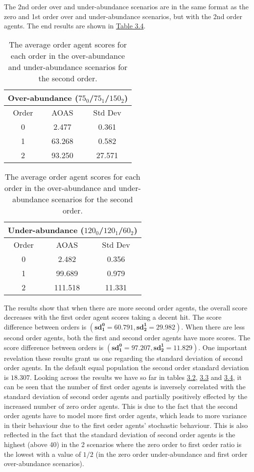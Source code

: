 The 2nd order over and under-abundance scenarios are in the same format as the zero and 1st order over and under-abundance scenarios, but with the 2nd order agents. The end results are shown in \hyperref[table:non-sig-second-order-simple]{Table 3.4}.

\begin{table}[h]
\centering
\begin{tabular}{|c|c|c|}
\hline
\multicolumn{3}{|c|}{Over-abundance ($75_{0}$/$75_{1}$/$150_{2}$)} \\
\hline
Order & AOAS & Std Dev \\
\hline
0     & 2.477   & 0.361    \\
1     & 63.268  & 0.582    \\
2     & 93.250  & 27.571   \\
\hline
\end{tabular}
\qquad
\begin{tabular}{|c|c|c|}
\hline
\multicolumn{3}{|c|}{Under-abundance ($120_{0}$/$120_{1}$/$60_{2}$)} \\
\hline
Order & AOAS & Std Dev \\
\hline
0     & 2.482   & 0.356   \\
1     & 99.689  & 0.979  \\
2     & 111.518 & 11.331 \\
\hline
\end{tabular}
\caption{The average order agent scores for each order in the over-abundance and under-abundance scenarios for the second order.}
\label{table:non-sig-second-order-simple}
\end{table}

The results show that when there are more second order agents, the overall score decreases with the first order agent scores taking a decent hit. The score difference between orders is $(\mathbf{sd^0_1 = 60.791}, \mathbf{sd^1_2 = 29.982})$. When there are less second order agents, both the first and second order agents have more scores. The score difference between orders is $(\mathbf{sd^0_1 = 97.207}, \mathbf{sd^1_2 = 11.829})$. One important revelation these results grant us one regarding the standard deviation of second order agents. In the default equal population the second order standard deviation is $\mathbf{18.307}$. Looking across the results we have so far in tables \hyperref[table:non-sig-zero-order-simple]{3.2}, \hyperref[table:non-sig-first-order-simple]{3.3} and \hyperref[table:non-sig-second-order-simple]{3.4}, it can be seen that the number of first order agents is inversely correlated with the standard deviation of second order agents and partially positively effected by the increased number of zero order agents. This is due to the fact that the second order agents have to model more first order agents, which leads to more variance in their behaviour due to the first order agents' stochastic behaviour. This is also reflected in the fact that the standard deviation of second order agents is the highest (above 40) in the 2 scenarios where the zero order to first order ratio is the lowest with a value of $1/2$ (in the zero order under-abundance and first order over-abundance scenarios). 